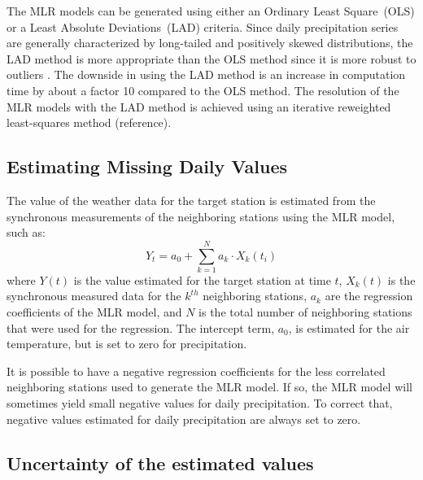 \documentclass[TechnicalNoteMeteo.tex]{subfiles}
\begin{document}
The MLR models can be generated using either an Ordinary Least Square~(OLS) or a Least Absolute Deviations~(LAD) criteria. Since daily precipitation series are generally characterized by long-tailed and positively skewed distributions, the LAD method is more appropriate than the OLS method since it is more robust to outliers \citep{menke_geophysical_1989,eischeid_creating_2000}. The downside in using the LAD method is an increase in computation time by about a factor 10 compared to the OLS method. The resolution of the MLR models with the LAD method is achieved using an iterative reweighted least-squares method (reference).



\subsection{Estimating Missing Daily Values}\label{sec:est_miss_values}

The value of the weather data for the target station is estimated from the synchronous measurements of the neighboring stations using the MLR model, such as:
%
\begin{equation}
    Y_{t} = a_0 + \sum_{k=1}^{N} a_k \cdot X_k(t_i)
\end{equation}
%
where $Y(t)$ is the value estimated for the target station at time $t$, $X_k(t)$ is the synchronous measured data for the $k^{th}$ neighboring stations, $a_k$ are the regression coefficients of the MLR model, and $N$ is the total number of neighboring stations that were used for the regression. The intercept term, $a_0$, is estimated for the air temperature, but is set to zero for precipitation. 

It is possible to have a negative regression coefficients for the less correlated neighboring stations used to generate the MLR model. If so, the MLR model will sometimes yield small negative values for daily precipitation. To correct that, negative values estimated for daily precipitation are always set to zero.

\subsection{Uncertainty of the estimated values}\label{subsec:crossval}
\end{document}
